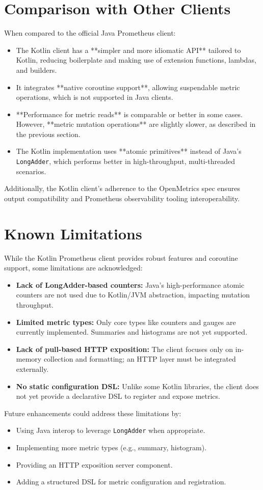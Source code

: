 \section{Comparison with Other Clients}

When compared to the official Java Prometheus client:
\begin{itemize}
  \item The Kotlin client has a **simpler and more idiomatic API** tailored to Kotlin, reducing boilerplate and making use of extension functions, lambdas, and builders.
  \item It integrates **native coroutine support**, allowing suspendable metric operations, which is not supported in Java clients.
  \item **Performance for metric reads** is comparable or better in some cases. However, **metric mutation operations** are slightly slower, as described in the previous section.
  \item The Kotlin implementation uses **atomic primitives** instead of Java’s \texttt{LongAdder}, which performs better in high-throughput, multi-threaded scenarios.
\end{itemize}

Additionally, the Kotlin client’s adherence to the OpenMetrics spec ensures output compatibility and Prometheus observability tooling interoperability.

\section{Known Limitations}

While the Kotlin Prometheus client provides robust features and coroutine support, some limitations are acknowledged:
\begin{itemize}
  \item \textbf{Lack of LongAdder-based counters:} Java's high-performance atomic counters are not used due to Kotlin/JVM abstraction, impacting mutation throughput.
  \item \textbf{Limited metric types:} Only core types like counters and gauges are currently implemented. Summaries and histograms are not yet supported.
  \item \textbf{Lack of pull-based HTTP exposition:} The client focuses only on in-memory collection and formatting; an HTTP layer must be integrated externally.
  \item \textbf{No static configuration DSL:} Unlike some Kotlin libraries, the client does not yet provide a declarative DSL to register and expose metrics.
\end{itemize}

Future enhancements could address these limitations by:
\begin{itemize}
  \item Using Java interop to leverage \texttt{LongAdder} when appropriate.
  \item Implementing more metric types (e.g., summary, histogram).
  \item Providing an HTTP exposition server component.
  \item Adding a structured DSL for metric configuration and registration.
\end{itemize}
